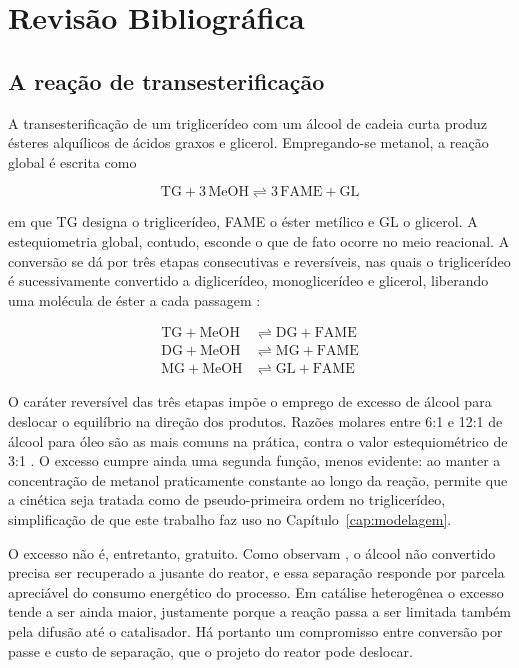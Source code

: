 \chapter{Revisão Bibliográfica}
\label{cap:revisao}

\section{A reação de transesterificação}

A transesterificação de um triglicerídeo com um álcool de cadeia curta produz
ésteres alquílicos de ácidos graxos e glicerol. Empregando-se metanol, a reação
global é escrita como

\begin{equation}
\mathrm{TG} + 3\,\mathrm{MeOH} \rightleftharpoons 3\,\mathrm{FAME} + \mathrm{GL}
\label{eq:global}
\end{equation}

\noindent
em que TG designa o triglicerídeo, FAME o éster metílico e GL o glicerol. A
estequiometria global, contudo, esconde o que de fato ocorre no meio reacional.
A conversão se dá por três etapas consecutivas e reversíveis, nas quais o
triglicerídeo é sucessivamente convertido a diglicerídeo, monoglicerídeo e
glicerol, liberando uma molécula de éster a cada passagem
\parencite{Noureddini1997}:

\begin{align}
\mathrm{TG}  + \mathrm{MeOH} &\rightleftharpoons \mathrm{DG} + \mathrm{FAME} \label{eq:etapa1}\\
\mathrm{DG}  + \mathrm{MeOH} &\rightleftharpoons \mathrm{MG} + \mathrm{FAME} \label{eq:etapa2}\\
\mathrm{MG}  + \mathrm{MeOH} &\rightleftharpoons \mathrm{GL} + \mathrm{FAME} \label{eq:etapa3}
\end{align}

O caráter reversível das três etapas impõe o emprego de excesso de álcool para
deslocar o equilíbrio na direção dos produtos. Razões molares entre
\num{6}:\num{1} e \num{12}:\num{1} de álcool para óleo são as mais comuns na
prática, contra o valor estequiométrico de \num{3}:\num{1}
\parencite{Freedman1986}. O excesso cumpre ainda uma segunda função, menos evidente:
ao manter a concentração de metanol praticamente constante ao longo da reação,
permite que a cinética seja tratada como de pseudo-primeira ordem no
triglicerídeo, simplificação de que este trabalho faz uso no
Capítulo~\ref{cap:modelagem}.

O excesso não é, entretanto, gratuito. Como observam \textcite{Allain2016}, o
álcool não convertido precisa ser recuperado a jusante do reator, e essa
separação responde por parcela apreciável do consumo energético do processo.
Em catálise heterogênea o excesso tende a ser ainda maior, justamente porque a
reação passa a ser limitada também pela difusão até o catalisador. Há portanto
um compromisso entre conversão por passe e custo de separação, que o projeto do
reator pode deslocar.

